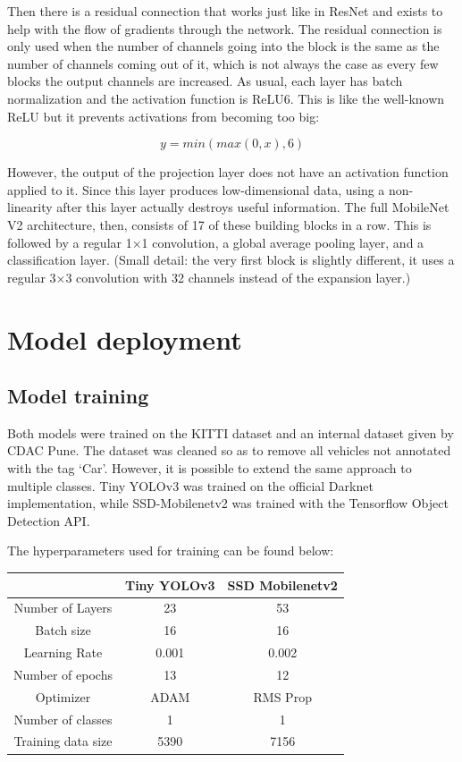 \documentclass[12pt,letterpaper]{article}
\begin{document}
Then there is a residual connection that works just like in ResNet and exists to help with the flow of gradients through the network. The residual connection is only used when the number of channels going into the block is the same as the number of channels coming out of it, which is not always the case as every few blocks the output channels are increased. As usual, each layer has batch normalization and the activation function is ReLU6. This is like the well-known ReLU but it prevents activations from becoming too big:

\[  y = min(max(0,x),6)  \]

However, the output of the projection layer does not have an activation function applied to it. Since this layer produces low-dimensional data, using a non-linearity after this layer actually destroys useful information.
The full MobileNet V2 architecture, then, consists of 17 of these building blocks in a row. This is followed by a regular 1×1 convolution, a global average pooling layer, and a classification layer. (Small detail: the very first block is slightly different, it uses a regular 3×3 convolution with 32 channels instead of the expansion layer.)

\section{Model deployment}

\subsection{Model training}

Both models were trained on the KITTI dataset and an internal dataset given by CDAC Pune. The dataset was cleaned so as to remove all vehicles not annotated with the tag `Car'. However, it is possible to extend the same approach to multiple classes. Tiny YOLOv3 was trained on the official Darknet implementation, while SSD-Mobilenetv2 was trained with the Tensorflow Object Detection API.

The hyperparameters used for training can be found below:

\medskip

\begin{center}
\begin{tabular}{c|cc}
     & Tiny YOLOv3 & SSD Mobilenetv2 \\
    \hline
    Number of Layers & 23 & 53 \\
    Batch size & 16 & 16 \\
    Learning Rate & 0.001 & 0.002 \\
    Number of epochs & 13 & 12 \\
    Optimizer & ADAM & RMS Prop \\
    Number of classes & 1 & 1 \\
    Training data size & 5390 & 7156 \\
\end{tabular}
\end{center}
\end{document}
